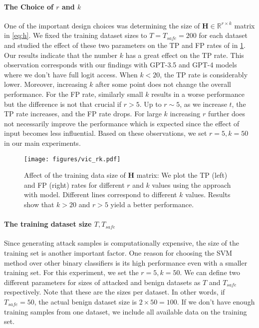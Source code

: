 \paragraph{The Choice of $r$ and $k$} 
One of the important design choices was determining the size of $\bm{H} \in \mathbb{R}^{r\times k}$ matrix in \cref{eq:h}. We fixed the training dataset sizes to $T=T_{safe}=200$ for each dataset and studied the effect of these two parameters on the TP and FP rates of \vicuna{} in \cref{fig:token}. Our results indicate that the number $k$ has a great effect on the TP rate. This observation corresponds with our findings with GPT-3.5 and GPT-4 models where we don't have full logit access. When $k<20$, the TP rate is considerably lower. Moreover, increasing $k$ after some point does not change the overall performance. For the FP rate, similarly small $k$ results in a worse performance but the difference is not that crucial if $r >5$. Up to $r\sim5$, as we increase $t$, the TP rate increases, and the FP rate drops. For large $k$ increasing $r$ further does not necessarily improve the performance which is expected since the effect of input becomes less influential. Based on these observations, we set $r=5, k=50$ in our main experiments. 

\begin{figure}[tb]
\centering
\texttt{[image: figures/vic\_rk.pdf]}
    \caption{Affect of the training data size of $\bm{H}$ matrix: We plot the TP (left) and FP (right) rates for different $r$ and $k$ values using the \methodname{} approach with \vicuna{} model. Different lines correspond to different $k$ values. Results show that $k>20$ and $r >5$ yield a better performance.
    }
\label{fig:token}
\end{figure}

\paragraph{The training dataset size $T, T_{safe}$}
Since generating attack samples is computationally expensive, the size of the training set is another important factor. One reason for choosing the SVM method over other binary classifiers is its high performance even with a smaller training set. For this experiment, we set the $r=5, k=50$. We can define two different parameters for sizes of attacked and benign datasets as $T$ and $T_{safe}$ respectively. Note that these are the sizes per dataset. In other words, if $T_{safe}=50$, the actual benign dataset size is $ 2\times 50=100$. If we don't have enough training samples from one dataset, we include all available data on the training set. 

